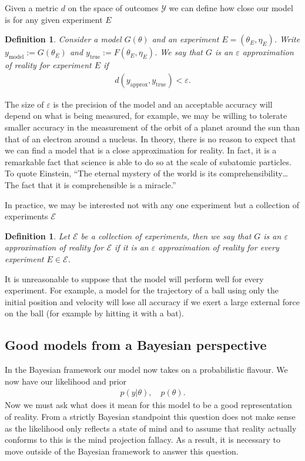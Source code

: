 \documentclass[
    a4paper,
    DIV=14,
    abstract=true,
    numbers=noenddot
]
{scrartcl}
\newtheorem{definition}[theorem]{Definition}
\theoremstyle{definition}
\newcommand{\Ee}{\mathcal{E}}
\newcommand{\Yy}{\mathcal{Y}}
\begin{document}
Given a metric $d$ on the space of outcomes $\Yy $ we can define how close our model is for any given experiment $E$
\begin{definition}
    Consider a model $G(\theta )$ and an experiment $E =(\theta_E,\eta_E)$. Write $y_{\text{model}}:= G(\theta_E)$ and $y_{\text{true}}:= F(\theta_E, \eta_E)$.     We say that $G$ is an \emph{$\varepsilon $ approximation of reality for experiment $E$} if
    \begin{align*}
        d(y_{\text{approx} },y_{\text{true} })< \varepsilon.
    \end{align*}
\end{definition}
The size of $\varepsilon $ is the precision of the model and an acceptable accuracy will depend on what is being measured, for example, we may be willing to tolerate smaller accuracy in the measurement of the orbit of a planet around the sun than that of an electron around a nucleus. In theory, there is no reason to expect that we can find a model that is a close approximation for reality. In fact, it is a remarkable fact that science is able to do so at the scale of subatomic particles. To quote Einstein, ``The eternal mystery of the world is its comprehensibility… The fact that it is comprehensible is a miracle.''

In practice, we may be interested not with any one experiment but a collection of experiments $\Ee $
\begin{definition}
    Let $\Ee $ be a collection of experiments, then we say that $G$ is an \emph{$\varepsilon $ approximation of reality for $\mathcal{E}$} if it is an $\varepsilon $ approximation of reality for every experiment $E \in \mathcal{E} $.
\end{definition}
It is unreasonable to suppose that the model will perform well for every experiment. For example, a model for the trajectory of a ball using only the initial position and velocity will lose all accuracy if we exert a large external force on the ball (for example by hitting it with a bat).

\subsection{Good models from a Bayesian perspective}
In the Bayesian framework our model now takes on a probabilistic flavour. We now have our likelihood and prior
\begin{align*}
    p(y|\theta ), \quad p(\theta ).
\end{align*}
Now we must ask what does it mean for this model to be a good representation of reality.
From a strictly Bayesian standpoint this question does not make sense as the likelihood only reflects a state of mind and to assume that reality actually conforms to this is the mind projection fallacy. As a result, it is necessary to move outside of the Bayesian framework to answer this question.
\end{document}
